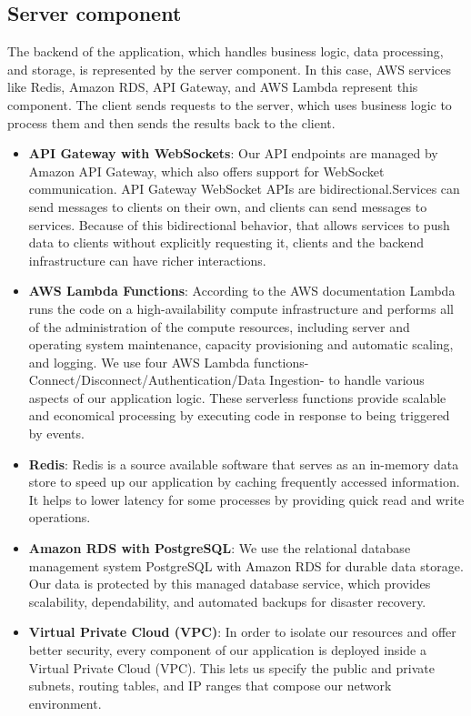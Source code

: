 \documentclass{article}
\begin{document}
\subsection{Server component}

\hspace{1cm}The backend of the application, which handles business logic, data processing, and storage, is represented by the server component. In this case, AWS services like Redis, Amazon RDS, API Gateway, and AWS Lambda represent this component. The client sends requests to the server, which uses business logic to process them and then sends the results back to the client.


\begin{itemize}
    \item \textbf{API Gateway with WebSockets}: Our API endpoints are managed by Amazon API Gateway, which also offers support for WebSocket communication. API Gateway WebSocket APIs are bidirectional.Services can send messages to clients on their own, and clients can send messages to services. Because of this bidirectional behavior, that allows services to push data to clients without explicitly requesting it, clients and the backend infrastructure can have richer interactions. 
    \item \textbf{AWS Lambda Functions}: According to the AWS documentation Lambda runs the code on a high-availability compute infrastructure and performs all of the administration of the compute resources, including server and operating system maintenance, capacity provisioning and automatic scaling, and logging. We use four AWS Lambda functions-Connect/Disconnect/Authentication/Data Ingestion- to handle various aspects of our application logic. These serverless functions provide scalable and economical processing by executing code in response to being triggered by events.
    \item \textbf{Redis}: Redis is a source available software that serves as an in-memory data store to speed up our application by caching frequently accessed information. It helps to lower latency for some processes by providing quick read and write operations.
    \item \textbf{Amazon RDS with PostgreSQL}: We use the relational database management system PostgreSQL with Amazon RDS for durable data storage. Our data is protected by this managed database service, which provides scalability, dependability, and automated backups for disaster recovery.
    \item \textbf{Virtual Private Cloud (VPC)}: In order to isolate our resources and offer better security, every component of our application is deployed inside a Virtual Private Cloud (VPC). This lets us specify the public and private subnets, routing tables, and IP ranges that compose our network environment.
    
\end{itemize}
\end{document}
